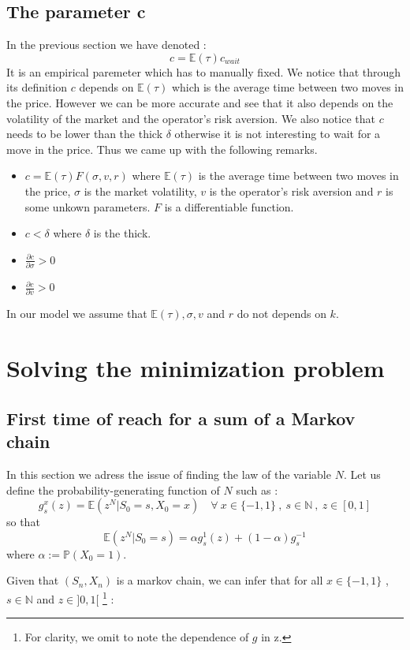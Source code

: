 \documentclass{article}
\begin{document}
\subsection{The parameter c}
In the previous section we have denoted :
$$
	c = \mathbb{E}(\tau) c_{wait}
$$
It is an empirical paremeter which has to manually fixed. We notice that through its definition $c$ depends on $\mathbb{E}(\tau)$ which is the average time between two moves in the price. However we can be more accurate and see that it also depends on the volatility of the market and the operator's risk aversion. We also notice that $c$ needs to be lower than the thick $\delta$ otherwise it is not interesting to wait for a move in the price.
Thus we came up with the following remarks.
\begin{itemize}
\item $c = \mathbb{E}(\tau) F(\sigma,v,r)$ where $ \mathbb{E}(\tau)$ is the average time between two moves in the price, $\sigma$ is the market volatility, $v$ is the operator's risk aversion and $r$ is some unkown parameters. $F$ is a differentiable function.
\item $c<\delta$ where $\delta$ is the thick.
\item $\frac{\partial c}{\partial \sigma} > 0$ 
\item $\frac{\partial c}{\partial v} > 0$ 
\end{itemize}
In our model we assume that $\mathbb{E}(\tau) , \sigma, v
$ and $r$ do not depends on $k$.

\newpage
\section{Solving the minimization problem}
\subsection{First time of reach for a sum of a Markov chain}
In this section we adress the issue of finding the law of the variable $N$. Let us define the  probability-generating function of $N$ such as :
$$ g_{s}^{x}(z) = \mathbb{E}(z^{N} | S_0=s, X_0=x) \quad \forall \ x \in \{-1,1\} \ , \ s \in \mathbb{N} \ , \ z \in [0,1]  $$
so that
$$\mathbb{E}(z^{N} | S_0=s) = \alpha  g_{s}^{1}(z) + (1-\alpha) g_{s}^{-1} $$
where $\alpha := \mathbb{P}(X_0 = 1)$.

Given that $(S_n, X_n)$ is a markov chain, we can infer that for all $x \in \{-1,1\}$ , $s \in \mathbb{N}$ and $z \in ]0,1[$ \footnote{For clarity, we omit to note the dependence of $g$ in z.} :
\end{document}
